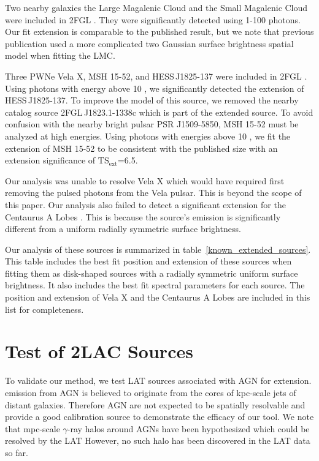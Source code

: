 \documentclass[12pt,preprint]{aastex}
\newcommand{\gev}{\text{GeV}\xspace}
\newcommand{\tsext}{{\ensuremath{\text{TS}_{\text{ext}}}}\xspace}
\begin{document}
Two nearby galaxies the Large Magalenic Cloud and the Small Magalenic
Cloud were included in 2FGL \citep{lmc,smc}.  They were significantly
detected using 1-100 \gev photons. Our
fit extension is comparable to the published result, but we note that
previous publication used a more complicated two Gaussian surface
brightness spatial model when fitting the LMC.

Three PWNe Vela X, MSH 15-52, and HESS\,J1825-137 were
included in 2FGL \citep{velax,msh1552,fermi_hess_j1825}.  Using photons
with energy above 10 \gev, we significantly detected the extension of
HESS\,J1825-137.  To improve the model of this source, we removed the
nearby catalog source 2FGL\,J1823.1-1338c which is part of the extended
source.  To avoid confusion with the nearby bright pulsar PSR J1509-5850, MSH 15-52 must be
analyzed at high energies.  Using photons with energies above 10 \gev,
we fit the extension of MSH 15-52 to be consistent with the published
size with an extension significance of \tsext=6.5.  

Our analysis was unable to resolve Vela X which would have required first
removing the pulsed photons from the Vela pulsar. This is beyond the
scope of this paper.  Our analysis also failed to detect a significant
extension for the Centaurus A Lobes \citep{cen_a_lat}. This is because
the source's emission is significantly different from a uniform
radially symmetric surface brightness.

Our analysis of these sources is summarized in
table~\ref{known_extended_sources}.  This table includes the best fit
position and extension of these sources when fitting them as disk-shaped
sources with a radially symmetric uniform surface brightness. It also
includes the best fit spectral parameters for each source.  The position
and extension of Vela X and the Centaurus A Lobes are included in this
list for completeness.

\section{Test of 2LAC Sources}
\label{test_2lac_sources}

To validate our method, we test LAT sources associated with AGN for
extension.  \gev emission from AGN is believed to originate from the cores
of kpc-scale jets of distant galaxies.  Therefore AGN are not expected
to be spatially resolvable and provide a good calibration source to
demonstrate the efficacy of our tool.  We note that mpc-scale $\gamma$-ray
halos around AGNs have been hypothesized \citep{pair_halo_paper} which
could be resolved by the LAT However, no such halo has been discovered
in the LAT data so far.
\end{document}
